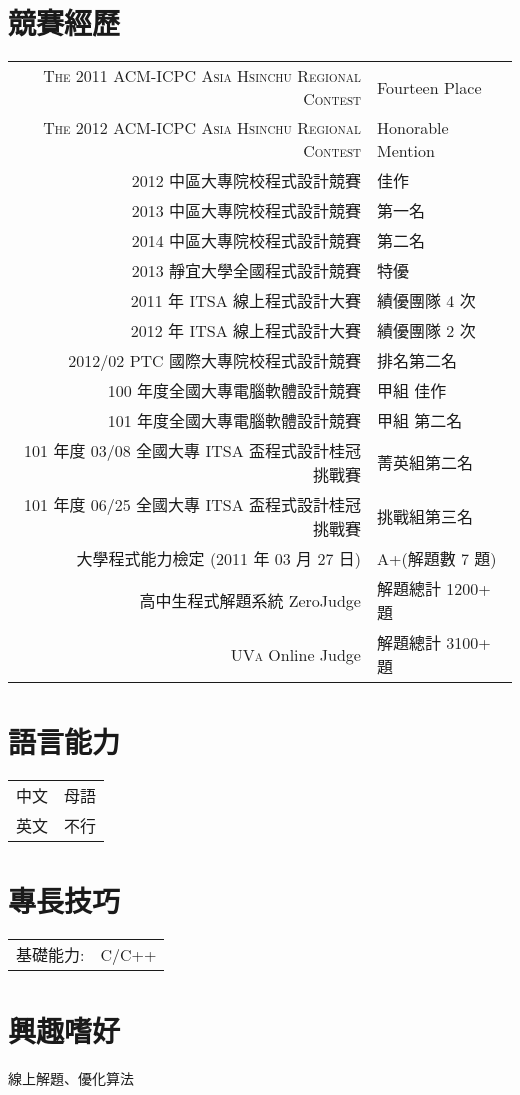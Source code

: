 \documentclass[a4paper,10pt]{article}
\begin{document}
\section{競賽經歷}
\begin{tabular}{rl}	
	\textsc{The 2011 ACM-ICPC Asia Hsinchu Regional Contest} & Fourteen Place \\
	\textsc{The 2012 ACM-ICPC Asia Hsinchu Regional Contest} & Honorable Mention \\
	2012 中區大專院校程式設計競賽 & 佳作 \\
	2013 中區大專院校程式設計競賽 & 第一名 \\
	2014 中區大專院校程式設計競賽 & 第二名 \\
	2013 靜宜大學全國程式設計競賽 & 特優 \\
	2011 年 ITSA 線上程式設計大賽 & 績優團隊 4 次 \\
	2012 年 ITSA 線上程式設計大賽 & 績優團隊 2 次 \\
	2012/02 PTC 國際大專院校程式設計競賽  & 排名第二名 \\
	100 年度全國大專電腦軟體設計競賽 & 甲組 佳作 \\
	101 年度全國大專電腦軟體設計競賽 & 甲組 第二名 \\
	101 年度 03/08 全國大專 ITSA 盃程式設計桂冠挑戰賽 & 菁英組第二名 \\
	101 年度 06/25 全國大專 ITSA 盃程式設計桂冠挑戰賽 & 挑戰組第三名 \\
	大學程式能力檢定 (2011 年 03 月 27 日) & A+(解題數 7 題) \\
	高中生程式解題系統 ZeroJudge 	& 解題總計 1200+ 題 \\
	\textsc{UVa} Online Judge 	& 解題總計 3100+ 題
\end{tabular}

\section{語言能力}
\begin{tabular}{rl}
	\textsc{中文} & 母語 \\
	\textsc{英文} & 不行 \\
\end{tabular}

\section{專長技巧}
\begin{tabular}{rl}
	基礎能力: & \textsc{C/C++}\\
\end{tabular}

\section{興趣嗜好}
線上解題、優化算法

\newpage
\end{document}
